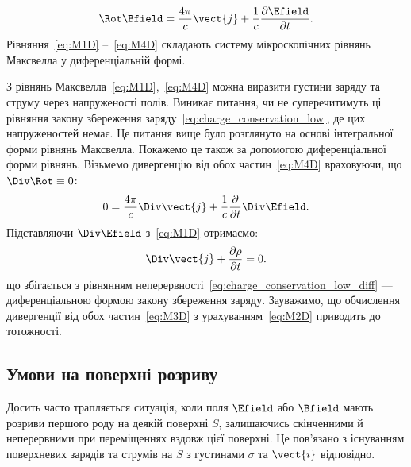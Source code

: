 \begin{equation}\label{eq:M4D}
	\Rot\Bfield = \frac{4\pi}c\vect{j} + \frac1c \frac{\partial\Efield}{\partial t}.
\end{equation}
Рівняння~\eqref{eq:M1D} --~\eqref{eq:M4D} складають систему мікроскопічних рівнянь Максвелла у диференціальній формі.

З рівнянь Максвелла~\eqref{eq:M1D},~\eqref{eq:M4D} можна виразити густини заряду та струму через напруженості полів.
Виникає питання, чи не суперечитимуть ці рівняння закону збереження заряду~\eqref{eq:charge_conservation_low}, де цих
напруженостей немає. Це питання вище було розглянуто на основі інтегральної форми рівнянь Максвелла. Покажемо це також
за допомогою диференціальної форми рівнянь. Візьмемо дивергенцію від обох частин~\eqref{eq:M4D} враховуючи, що
$\Div\Rot\equiv0$:
\begin{equation*}
	0 = \frac{4\pi}c\Div\vect{j} + \frac1c \frac{\partial}{\partial t} \Div\Efield.
\end{equation*}
Підставляючи $\Div\Efield$ з~\eqref{eq:M1D} отримаємо:
\begin{equation*}
	\Div\vect{j} + \frac{\partial\rho}{\partial t} = 0.
\end{equation*}
що збігається з рівнянням неперервності~\eqref{eq:charge_conservation_low_diff} --- диференціальною формою закону
збереження заряду. Зауважимо, що обчислення дивергенції від обох частин~\eqref{eq:M3D} з урахуванням~\eqref{eq:M2D}
приводить до тотожності.


\subsection*{Умови на поверхні розриву}


Досить часто трапляється ситуація, коли поля $\Efield$ або $\Bfield$ мають розриви першого роду на деякій поверхні $S$,
залишаючись скінченними й неперервними при переміщеннях вздовж цієї поверхні. Це пов'язано з існуванням поверхневих
зарядів та струмів на $S$ з густинами $\sigma$ та $\vect{i}$ відповідно.

